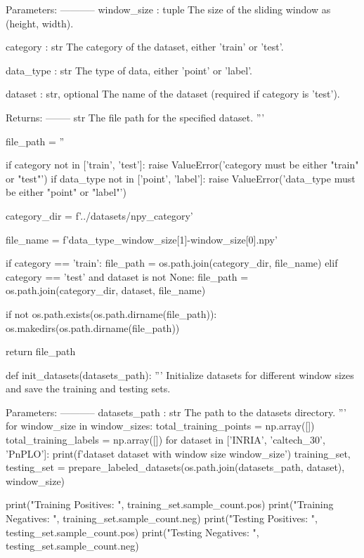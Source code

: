 \begin{pythoncode}
    Parameters:
    -----------
    window_size : tuple
        The size of the sliding window as (height, width).
    
    category : str
        The category of the dataset, either 'train' or 'test'.
    
    data_type : str
        The type of data, either 'point' or 'label'.
    
    dataset : str, optional
        The name of the dataset (required if category is 'test').

    Returns:
    --------
    str
        The file path for the specified dataset.
    '''

    file_path = ''

    if category not in ['train', 'test']:
        raise ValueError('category must be either "train" or "test"')
    if data_type not in ['point', 'label']:
        raise ValueError('data_type must be either "point" or "label"')

    category_dir = f'../datasets/npy_{category}'

    file_name = f'{data_type}_{window_size[1]}-{window_size[0]}.npy'

    if category == 'train':
        file_path = os.path.join(category_dir, file_name)
    elif category == 'test' and dataset is not None:
        file_path = os.path.join(category_dir, dataset, file_name)

    if not os.path.exists(os.path.dirname(file_path)):
        os.makedirs(os.path.dirname(file_path))

    return file_path


def init_datasets(datasets_path):
    '''
    Initialize datasets for different window sizes and save the training and testing sets.

    Parameters:
    -----------
    datasets_path : str
        The path to the datasets directory.
    '''
    for window_size in window_sizes:
        total_training_points = np.array([])
        total_training_labels = np.array([])
        for dataset in ['INRIA', 'caltech_30', 'PnPLO']:
            print(f'\n\nInitializing dataset {dataset} with window size {window_size}\n')
            training_set, testing_set = prepare_labeled_datasets(os.path.join(datasets_path, dataset), window_size)

            print("Training Positives: ", training_set.sample_count.pos)
            print("Training Negatives: ", training_set.sample_count.neg)
            print("Testing Positives: ", testing_set.sample_count.pos)
            print("Testing Negatives: ", testing_set.sample_count.neg)


\end{pythoncode}
